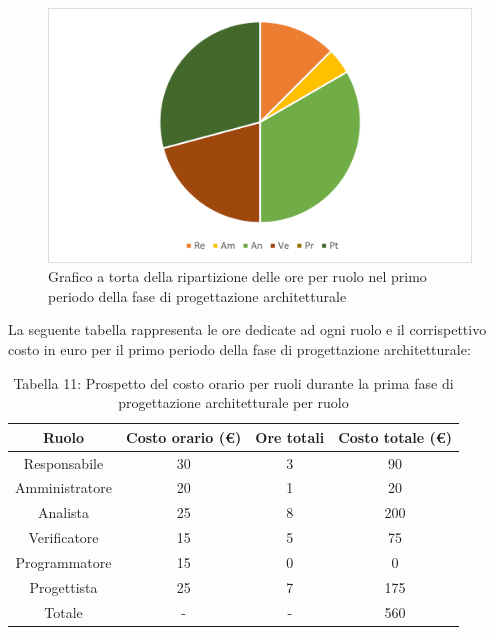 \begin{figure}[H]
    \centering
    \includegraphics[scale=0.6]{img/grafi preventivo/torta/architetturale/periodo1.png}
    \caption{Grafico a torta della ripartizione delle ore per ruolo nel primo periodo della fase di progettazione architetturale}
\end{figure}
La seguente tabella rappresenta le ore dedicate ad ogni ruolo e il corrispettivo costo in euro per il primo periodo della fase di progettazione architetturale:
\begin{table}[h]
	\setlength\extrarowheight{5pt}
	\centering
	\begin{tabularx}{\textwidth}{|ccc|c|}
		\hline
		\rowcolor{white}
		\textbf{Ruolo} & \textbf{Costo orario (€)} & \textbf{Ore totali} & \textbf{Costo totale (€)} \\
		\hline
		Responsabile &30&3&90 \\
		Amministratore &20&1&20 \\
		Analista &25&8&200 \\
		Verificatore &15&5&75 \\
		Programmatore &15&0&0 \\
		Progettista &25&7&175 \\
		\hline
		Totale &-&-&560 \\
		\hline
	\end{tabularx}
    \vspace{10pt}
	\caption{Tabella 11: Prospetto del costo orario per ruoli durante la prima fase di progettazione architetturale per ruolo}
\end{table}
